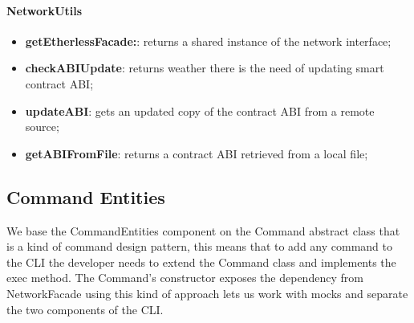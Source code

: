\paragraph{NetworkUtils}
\begin{itemize}
    \item \textbf{getEtherlessFacade:}: returns a shared instance of the network interface;
    \item \textbf{checkABIUpdate}: returns weather there is the need of updating smart contract ABI;
    \item \textbf{updateABI}: gets an updated copy of the contract ABI from a remote source;
    \item \textbf{getABIFromFile}: returns a contract ABI retrieved from a local file;
\end{itemize}
\newpage
\subsection{Command Entities}
We base the CommandEntities component on the Command abstract class that is a kind of command design pattern, this means that to add any command to the CLI the developer needs to extend the Command class and implements the exec method.
The Command's constructor exposes the dependency from NetworkFacade using this kind of approach lets us work with mocks and separate the two components of the CLI.
